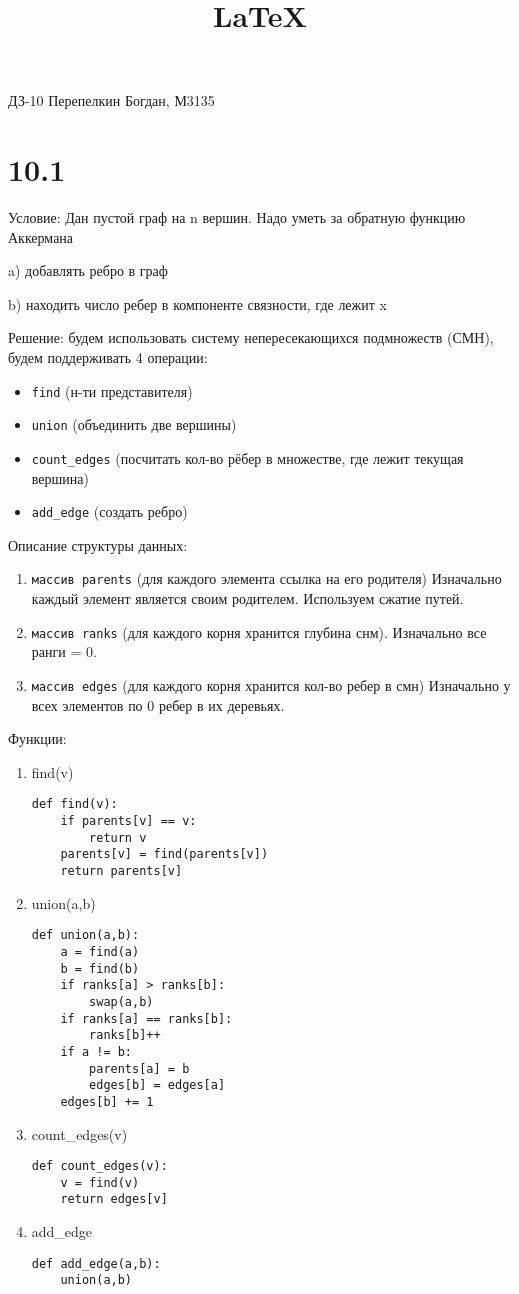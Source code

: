 \documentclass[12pt]{article}
\title{\LaTeX}
\date{}
\author{}
\begin{document}
  

\title{}
ДЗ-10 Перепелкин Богдан, М3135

\section{10.1}

Условие: Дан пустой граф на n вершин. Надо уметь за обратную функцию Аккермана

a) добавлять ребро в граф

b) находить число ребер в компоненте связности, где лежит x

Решение: будем использовать систему непересекающихся подмножеств (СМН), будем
поддерживать 4 операции: 
\begin{itemize}
    \item \texttt{find} (н-ти представителя)
    \item \texttt{union} (объединить две вершины)
    \item \texttt{count\_edges} (посчитать кол-во рёбер в множестве, где лежит текущая вершина)
    \item \texttt{add\_edge} (создать ребро)
\end{itemize}

Описание структуры данных:
\begin{enumerate}
    \item \texttt{массив parents} (для каждого элемента ссылка на его родителя)
Изначально каждый элемент является своим родителем. Используем сжатие путей.
    \item \texttt{массив ranks} (для каждого корня хранится глубина снм).
Изначально все ранги = 0.
    \item \texttt{массив edges} (для каждого корня хранится кол-во ребер в смн)
Изначально у всех элементов по 0 ребер в их деревьях.
\end{enumerate}

Функции:
\begin{enumerate}
    \item find(v)
\begin{lstlisting}
def find(v):
    if parents[v] == v:
        return v
    parents[v] = find(parents[v])
    return parents[v]
\end{lstlisting}
    \item union(a,b)
\begin{lstlisting}
def union(a,b):
    a = find(a)
    b = find(b)
    if ranks[a] > ranks[b]:
        swap(a,b)
    if ranks[a] == ranks[b]:
        ranks[b]++
    if a != b:
        parents[a] = b
        edges[b] = edges[a]
    edges[b] += 1
\end{lstlisting}
    \item count\_edges(v)
\begin{lstlisting}
def count_edges(v):
    v = find(v)
    return edges[v]
\end{lstlisting}
    \item add\_edge
\begin{lstlisting}
def add_edge(a,b):
    union(a,b)
\end{lstlisting}
\end{enumerate}
\end{document}
